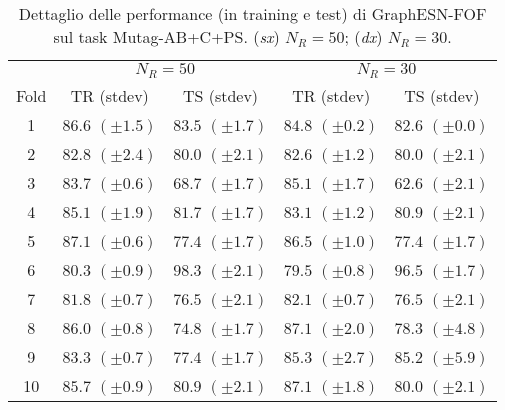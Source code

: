 \begin{table}[tbph]
\footnotesize
\caption[Dettaglio performance: GraphESN-FOF su Mutag-AB+C+PS]{Dettaglio delle performance (in training e test) di GraphESN-FOF sul task Mutag-AB+C+PS. (\emph{sx}) $N_R=50$; (\emph{dx}) $N_R=30$.}
\label{app:esp:Mutag-ABCPC-FOF}
\centering
\begin{tabular}{c*{4}{c}}
\toprule
& \multicolumn{2}{c}{$N_R=50$} & \multicolumn{2}{c}{$N_R=30$}\\
Fold & TR (stdev) & TS (stdev) & TR (stdev) & TS (stdev)\\
\midrule
1 & $86.6$ $(\pm 1.5)$ & $83.5$ $(\pm 1.7)$ & $84.8$ $(\pm 0.2)$ & $82.6$ $(\pm 0.0)$\\
2 & $82.8$ $(\pm 2.4)$ & $80.0$ $(\pm 2.1)$ & $82.6$ $(\pm 1.2)$ & $80.0$ $(\pm 2.1)$\\
3 & $83.7$ $(\pm 0.6)$ & $68.7$ $(\pm 1.7)$ & $85.1$ $(\pm 1.7)$ & $62.6$ $(\pm 2.1)$\\
4 & $85.1$ $(\pm 1.9)$ & $81.7$ $(\pm 1.7)$ & $83.1$ $(\pm 1.2)$ & $80.9$ $(\pm 2.1)$\\
5 & $87.1$ $(\pm 0.6)$ & $77.4$ $(\pm 1.7)$ & $86.5$ $(\pm 1.0)$ & $77.4$ $(\pm 1.7)$\\
6 & $80.3$ $(\pm 0.9)$ & $98.3$ $(\pm 2.1)$ & $79.5$ $(\pm 0.8)$ & $96.5$ $(\pm 1.7)$\\
7 & $81.8$ $(\pm 0.7)$ & $76.5$ $(\pm 2.1)$ & $82.1$ $(\pm 0.7)$ & $76.5$ $(\pm 2.1)$\\
8 & $86.0$ $(\pm 0.8)$ & $74.8$ $(\pm 1.7)$ & $87.1$ $(\pm 2.0)$ & $78.3$ $(\pm 4.8)$\\
9 & $83.3$ $(\pm 0.7)$ & $77.4$ $(\pm 1.7)$ & $85.3$ $(\pm 2.7)$ & $85.2$ $(\pm 5.9)$\\
10 & $85.7$ $(\pm 0.9)$ & $80.9$ $(\pm 2.1)$ & $87.1$ $(\pm 1.8)$ & $80.0$ $(\pm 2.1)$\\
\bottomrule
\end{tabular}
\end{table}






